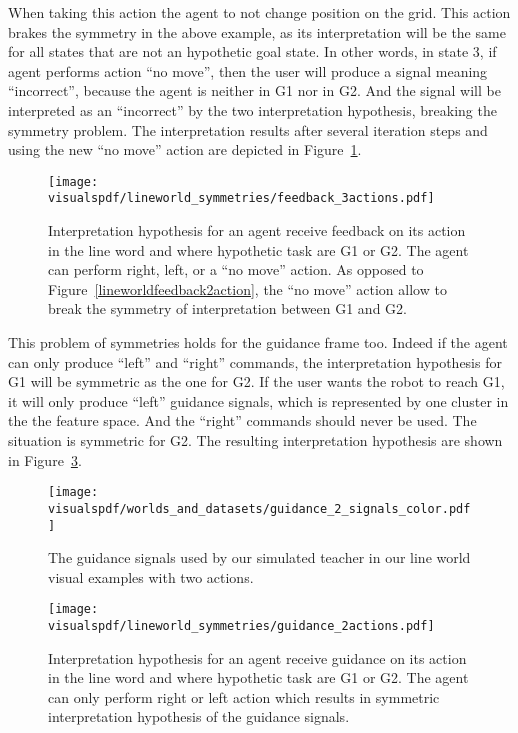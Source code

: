 When taking this action the agent to not change position on the grid. This action brakes the symmetry in the above example, as its interpretation will be the same for all states that are not an hypothetic goal state. In other words, in state 3, if agent performs action ``no move'', then the user will produce a signal meaning ``incorrect'', because the agent is neither in G1 nor in G2. And the signal will be interpreted as an ``incorrect'' by the two interpretation hypothesis, breaking the symmetry problem. The interpretation results after several iteration steps and using the new ``no move'' action are depicted in Figure~\ref{fig:lineworldfeedback3action}.

\begin{figure}[!htbp]
  \centering
  \texttt{[image: \\visualspdf/lineworld\_symmetries/feedback\_3actions.pdf]}
  \caption{Interpretation hypothesis for an agent receive feedback on its action in the line word and where hypothetic task are G1 or G2. The agent can perform right, left, or a ``no move'' action. As opposed to Figure~\ref{lineworldfeedback2action}, the ``no move'' action allow to break the symmetry of interpretation between G1 and G2.}
  \label{fig:lineworldfeedback3action}
\end{figure}

This problem of symmetries holds for the guidance frame too. Indeed if the agent can only produce ``left'' and ``right'' commands, the interpretation hypothesis for G1 will be symmetric as the one for G2. If the user wants the robot to reach G1, it will only produce ``left'' guidance signals, which is represented by one cluster in the the feature space. And the ``right'' commands should never be used. The situation is symmetric for G2. The resulting interpretation hypothesis are shown in Figure~\ref{fig:lineworldguidance2action}.

\begin{figure}[!htbp]
  \centering
  \texttt{[image: \\visualspdf/worlds\_and\_datasets/guidance\_2\_signals\_color.pdf]}
  \caption{The guidance signals used by our simulated teacher in our line world visual examples with two actions.}
  \label{fig:lineworldguidance2signals}
\end{figure}

\begin{figure}[!htbp]
  \centering
  \texttt{[image: \\visualspdf/lineworld\_symmetries/guidance\_2actions.pdf]}
  \caption{Interpretation hypothesis for an agent receive guidance on its action in the line word and where hypothetic task are G1 or G2. The agent can only perform right or left action which results in symmetric interpretation hypothesis of the guidance signals.}
  \label{fig:lineworldguidance2action}
\end{figure}

